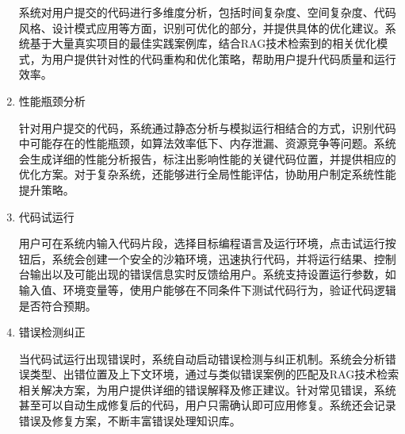 \documentclass[
    report,     %
    oneside,    %
    UTF8,       %
    zihao=-4    %
]{config} %
\begin{document}
\begin{enumerate}[label=(\arabic*)]
    系统对用户提交的代码进行多维度分析，包括时间复杂度、空间复杂度、代码风格、设计模式应用等方面，识别可优化的部分，并提供具体的优化建议。系统基于大量真实项目的最佳实践案例库，结合RAG技术检索到的相关优化模式，为用户提供针对性的代码重构和优化策略，帮助用户提升代码质量和运行效率。
    
    \item 性能瓶颈分析
    
    针对用户提交的代码，系统通过静态分析与模拟运行相结合的方式，识别代码中可能存在的性能瓶颈，如算法效率低下、内存泄漏、资源竞争等问题。系统会生成详细的性能分析报告，标注出影响性能的关键代码位置，并提供相应的优化方案。对于复杂系统，还能够进行全局性能评估，协助用户制定系统性能提升策略。
    
    \item 代码试运行
    
    用户可在系统内输入代码片段，选择目标编程语言及运行环境，点击试运行按钮后，系统会创建一个安全的沙箱环境，迅速执行代码，并将运行结果、控制台输出以及可能出现的错误信息实时反馈给用户。系统支持设置运行参数，如输入值、环境变量等，使用户能够在不同条件下测试代码行为，验证代码逻辑是否符合预期。
    
    \item 错误检测纠正
    
    当代码试运行出现错误时，系统自动启动错误检测与纠正机制。系统会分析错误类型、出错位置及上下文环境，通过与类似错误案例的匹配及RAG技术检索相关解决方案，为用户提供详细的错误解释及修正建议。针对常见错误，系统甚至可以自动生成修复后的代码，用户只需确认即可应用修复。系统还会记录错误及修复方案，不断丰富错误处理知识库。
    

\end{enumerate}
\end{document}
